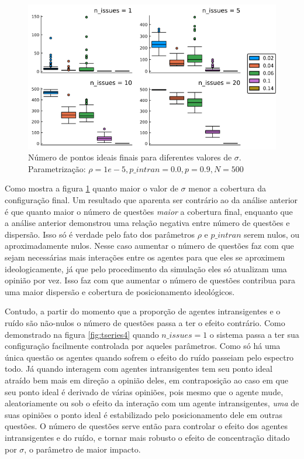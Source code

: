   \begin{figure}[H]
    \centering
    \includegraphics[scale=0.7]{ims/boxes4.png}
    \caption{Número de pontos ideais finais para diferentes valores de \(\sigma\).
      Parametrização: \(\rho =1e-5, p\_intran = 0.0, p = 0.9, N =500\)}
    \label{fig:box4}
  \end{figure}
  
  Como mostra a figura \ref{fig:box4} quanto maior o valor de \(\sigma\) menor a
  cobertura da configuração final. Um resultado que aparenta ser contrário ao da
  análise anterior é que quanto maior o número de questões \textit{maior} a
  cobertura final, enquanto que a análise anterior demonstrou uma relação
  negativa entre número de questões e dispersão. Isso só é verdade pelo fato dos
  parâmetros \(\rho\) e \(p\_intran\) serem nulos, ou aproximadamente nulos. Nesse
  caso aumentar o número de questões faz com que sejam necessárias mais
  interações entre os agentes para que eles se aproximem ideologicamente, já que
  pelo procedimento da simulação eles só atualizam uma opinião por vez. Isso faz
  com que aumentar o número de questões contribua para uma maior dispersão e
  cobertura de posicionamento ideológicos.
  
  Contudo, a partir do momento que a proporção de agentes intransigentes e o
  ruído são não-nulos o número de questões passa a ter o efeito contrário. Como
  demonstrado na figura \ref{fig:tseries4} quando \(n\_issues = 1\) o sistema
  passa a ter sua configuração facilmente controlada por aqueles parâmetros.
  Como só há uma única questão os agentes quando sofrem o efeito do ruído
  passeiam pelo espectro todo. Já quando interagem com agentes intransigentes
  tem seu ponto ideal atraído bem mais em direção a opinião deles, em
  contraposição ao caso em que seu ponto ideal é derivado de várias opiniões,
  pois mesmo que o agente mude, aleatoriamente ou sob o efeito da interação com
  um agente intransigentes, \textit{uma} de suas opiniões o ponto ideal é
  estabilizado pelo posicionamento dele em outras questões. O número de questões
  serve então para controlar o efeito dos agentes intransigentes e do ruído, e
  tornar mais robusto o efeito de concentração ditado por \(\sigma\), o parâmetro de
  maior impacto.

